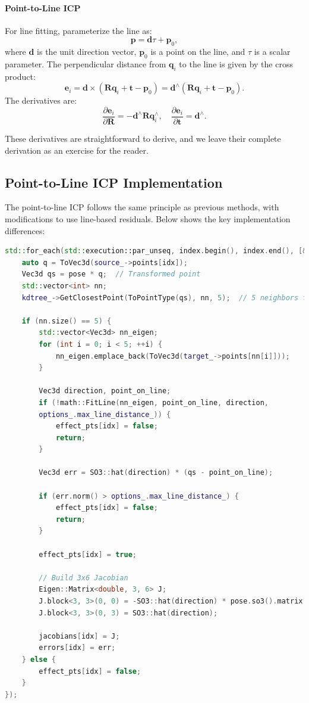 \paragraph{Point-to-Line ICP}  
For line fitting, parameterize the line as:
\begin{equation}\label{key}
	\mathbf{p} = \mathbf{d} \tau + \mathbf{p}_0,
\end{equation}
where $\mathbf{d}$ is the unit direction vector, $\mathbf{p}_0$ is a point on the line, and $\tau$ is a scalar parameter. The perpendicular distance from $\mathbf{q}_i$ to the line is given by the cross product:
\begin{equation}\label{key}
	\mathbf{e}_i = \mathbf{d} \times (\mathbf{R} \mathbf{q}_i + \mathbf{t} - \mathbf{p}_0) = \mathbf{d}^\wedge (\mathbf{R} \mathbf{q}_i + \mathbf{t} - \mathbf{p}_0).
\end{equation}
The derivatives are:
\begin{equation}\label{key}
	\frac{\partial \mathbf{e}_i}{\partial \mathbf{R}} = -\mathbf{d}^\wedge \mathbf{R} \mathbf{q}_i^\wedge, \quad \frac{\partial \mathbf{e}_i}{\partial \mathbf{t}} = \mathbf{d}^\wedge.
\end{equation}

These derivatives are straightforward to derive, and we leave their complete derivation as an exercise for the reader.

\subsection{Point-to-Line ICP Implementation}
The point-to-line ICP follows the same principle as previous methods, with modifications to use line-based residuals. Below shows the key implementation differences:

\begin{lstlisting}[language=c++,caption=ch7/icp\_3d.cc]
std::for_each(std::execution::par_unseq, index.begin(), index.end(), [&](int idx) {
	auto q = ToVec3d(source_->points[idx]);
	Vec3d qs = pose * q;  // Transformed point
	std::vector<int> nn;
	kdtree_->GetClosestPoint(ToPointType(qs), nn, 5);  // 5 neighbors for line fitting
	
	if (nn.size() == 5) {
		std::vector<Vec3d> nn_eigen;
		for (int i = 0; i < 5; ++i) {
			nn_eigen.emplace_back(ToVec3d(target_->points[nn[i]]));
		}
		
		Vec3d direction, point_on_line;
		if (!math::FitLine(nn_eigen, point_on_line, direction, 
		options_.max_line_distance_)) {
			effect_pts[idx] = false;
			return;
		}
		
		Vec3d err = SO3::hat(direction) * (qs - point_on_line);
		
		if (err.norm() > options_.max_line_distance_) {
			effect_pts[idx] = false;
			return;
		}
		
		effect_pts[idx] = true;
		
		// Build 3x6 Jacobian
		Eigen::Matrix<double, 3, 6> J;
		J.block<3, 3>(0, 0) = -SO3::hat(direction) * pose.so3().matrix() * SO3::hat(q);
		J.block<3, 3>(0, 3) = SO3::hat(direction);
		
		jacobians[idx] = J;
		errors[idx] = err;
	} else {
		effect_pts[idx] = false;
	}
});
\end{lstlisting}

